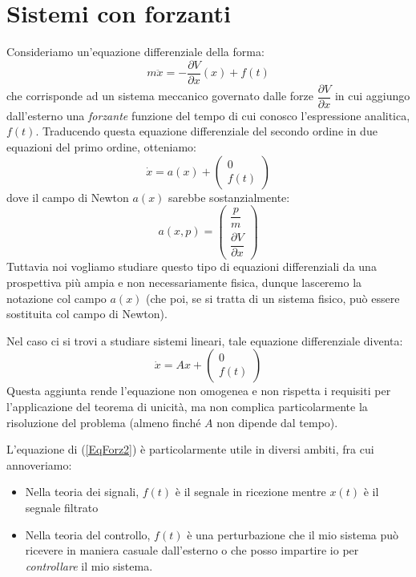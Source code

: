 \documentclass[a4paper,openany]{article}
\begin{document}
	
	
	
	
	\newpage
	
	\section{Sistemi con forzanti}
	Consideriamo un'equazione differenziale della forma:
	\begin{equation}
		m\ddot{x} = -\dfrac{\partial V}{\partial x}(x) + f(t)
		\label{EqForz1}
	\end{equation}
	che corrisponde ad un sistema meccanico governato dalle forze $\dfrac{\partial V}{\partial x}$ in cui aggiungo dall'esterno una \textit{forzante} funzione del tempo di cui conosco l'espressione analitica, $f(t)$. Traducendo questa equazione differenziale del secondo ordine in due equazioni del primo ordine, otteniamo:
	\begin{equation}
		\dot{x} = a(x) +
		\begin{pmatrix}
			0 \\ f(t)
		\end{pmatrix}
	\end{equation}
	dove il campo di Newton $a(x)$ sarebbe sostanzialmente:
	\begin{equation}\label{key}
		a(x,p) =
		\begin{pmatrix}
			\dfrac{p}{m} \\[6pt]
			\dfrac{\partial V}{\partial x}
		\end{pmatrix}
	\end{equation}
	Tuttavia noi vogliamo studiare questo tipo di equazioni differenziali da una prospettiva più ampia e non necessariamente fisica, dunque lasceremo la notazione col campo $a(x)$ (che poi, se si tratta di un sistema fisico, può essere sostituita col campo di Newton).
	
	Nel caso ci si trovi a studiare sistemi lineari, tale equazione differenziale diventa:
	\begin{equation}
		\dot{x} = Ax +
		\begin{pmatrix}
			0 \\ f(t)
		\end{pmatrix}
		\label{EqForz2}
	\end{equation}
	Questa aggiunta rende l'equazione non omogenea e non rispetta i requisiti per l'applicazione del teorema di unicità, ma non complica particolarmente la risoluzione del problema (almeno finché $A$ non dipende dal tempo).
	
	L'equazione di (\ref{EqForz2}) è particolarmente utile in diversi ambiti, fra cui annoveriamo:
	\begin{itemize}
		\item Nella teoria dei signali, $f(t)$ è il segnale in ricezione mentre $x(t)$ è il segnale filtrato
		\item Nella teoria del controllo, $f(t)$ è una perturbazione che il mio sistema può ricevere in maniera casuale dall'esterno o che posso impartire io per \textit{controllare} il mio sistema.
	\end{itemize}
	
\end{document}
